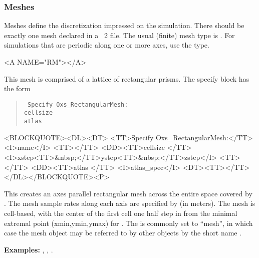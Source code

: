 \subsubsection{Meshes}\label{sec:Meshes}
Meshes define the discretization impressed on the simulation.  There
should be exactly one mesh declared in a \MIF~2 file.  The usual
(finite) mesh type is .  For simulations that
are periodic along one or more axes, use the
 type.

\begin{description}
\begin{rawhtml}<A NAME="RM"></A>\end{rawhtml}%
\label{html:oxsrectangularmesh}%
\item[Oxs\_RectangularMesh:]
This mesh is comprised of a lattice of rectangular prisms.
The specify block has the form
\begin{latexonly}
\begin{quote}\tt
Specify Oxs\_RectangularMesh: \ocb \\
\bi cellsize \ocb{}\ccb\\
\bi atlas \\
\ccb
\end{quote}
\end{latexonly}
\begin{rawhtml}<BLOCKQUOTE><DL><DT>
<TT>Specify Oxs_RectangularMesh:</TT><I>name</I> <TT>{</TT>
<DD><TT>cellsize {</TT>
  <I>xstep<TT>&nbsp;</TT>ystep<TT>&nbsp;</TT>zstep</I>
  <TT>}</TT>
<DD><TT>atlas </TT> <I>atlas_spec</I>
<DT><TT>}</TT></DL></BLOCKQUOTE><P>
\end{rawhtml}
This creates an axes parallel rectangular mesh across the entire space
covered by .  The mesh sample rates along each axis are
specified by  (in meters).  The mesh is
cell-based, with the center of the first cell one half step in from the
minimal extremal point (xmin,ymin,ymax) for .
The  is commonly set to ``mesh'', in which case the mesh
object may be referred to by other  objects by the short
name .

\textbf{Examples:} , , .


\end{description}
